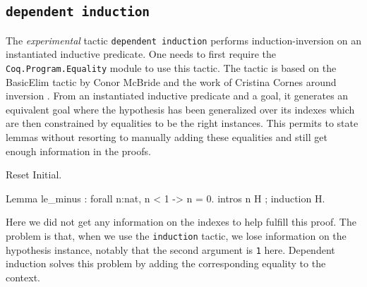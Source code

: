 \begin{coq_example*}

\subsection{\tt dependent induction \ident}
\label{DepInduction}

The \emph{experimental} tactic \texttt{dependent induction} performs
induction-inversion on an instantiated inductive predicate.
One needs to first require the {\tt Coq.Program.Equality} module to use
this tactic. The tactic is based on the BasicElim tactic by Conor
McBride \cite{DBLP:conf/types/McBride00} and the work of Cristina Cornes
around inversion \cite{DBLP:conf/types/CornesT95}. From an instantiated
inductive predicate and a goal, it generates an equivalent goal where the
hypothesis has been generalized over its indexes which are then
constrained by equalities to be the right instances. This permits to
state lemmas without resorting to manually adding these equalities and
still get enough information in the proofs.

\Example

\begin{coq_eval}
Reset Initial.
\end{coq_eval}
\begin{coq_example}
Lemma le_minus : forall n:nat, n < 1 -> n = 0.
intros n H ; induction H.
\end{coq_example}

Here we did not get any information on the indexes to help fulfill this
proof. The problem is that, when we use the \texttt{induction} tactic,
we lose information on the hypothesis instance, notably that the second
argument is \texttt{1} here. Dependent induction solves this problem by
adding the corresponding equality to the context.


\end{coq_example*}
